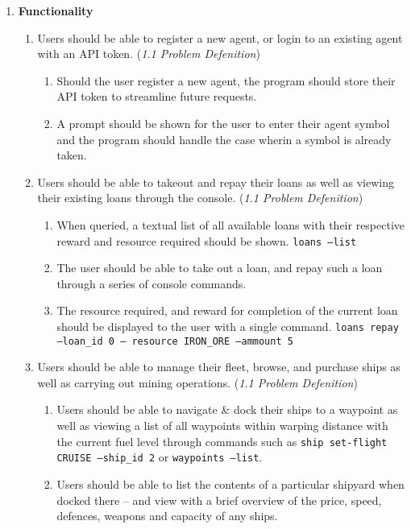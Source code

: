 \begin{enumerate}
    \item \textbf{Functionality}
    \begin{enumerate}
        \item Users should be able to register a new agent, or login to an existing agent with an API token. (\textit{1.1 Problem Defenition})
            \begin{enumerate}
                \item Should the user register a new agent, the program should store their API token to streamline future requests.
                \item A prompt should be shown for the user to enter their agent symbol and the program should handle the case wherin a symbol is already taken.
            \end{enumerate}
        \item Users should be able to takeout and repay their loans as well as viewing their existing loans through the console. (\textit{1.1 Problem Defenition})
            \begin{enumerate}
                \item When queried, a textual list of all available loans with their respective reward and resource required should be shown. \texttt{loans --list}
                \item The user should be able to take out a loan, and repay such a loan through a series of console commands. 
                \item The resource required, and reward for completion of the current loan should be displayed to the user with a single command. \texttt{loans repay --loan\_id 0 -- resource IRON\_ORE --ammount 5}
            \end{enumerate}
        \item Users should be able to manage their fleet, browse, and purchase ships as well as carrying out mining operations. (\textit{1.1 Problem Defenition})
            \begin{enumerate}
                \item Users should be able to navigate \& dock their ships to a waypoint as well as viewing a list of all waypoints within warping distance with the current fuel level through commands such as \texttt{ship set-flight CRUISE --ship\_id 2} or \texttt{waypoints --list}.
                \item Users should be able to list the contents of a particular shipyard when docked there – and view with a brief overview of the price, speed, defences, weapons and capacity of any ships.

\end{enumerate}
\end{enumerate}
\end{enumerate}

